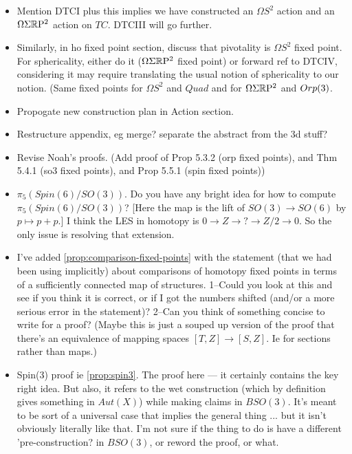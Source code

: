 \documentclass{amsart}
\begin{document}
\begin{itemize}
\item Mention DTCI plus this implies we have constructed an $\Omega S^2$ action and an $\Omega \Sigma \mathbb R \mathrm{P}^2$ action on $TC$.  DTCIII will go further.
\item Similarly, in ho fixed point section, discuss that pivotality is $\Omega S^2$ fixed point.  For sphericality, either do it ($\Omega \Sigma \mathbb R \mathrm{P}^2$ fixed point) or forward ref to DTCIV, considering it may require translating the usual notion of sphericality to our notion.  (Same fixed points for $\Omega S^2$ and $Quad$ and for $\Omega \Sigma \mathbb R \mathrm{P}^2$ and $Orp(3)$.
\end{itemize}

\begin{itemize}
\item Propogate new construction plan in Action section.
\item Restructure appendix, eg merge? separate the abstract from the 3d stuff?
\item Revise Noah's proofs. (Add proof of Prop 5.3.2 (orp fixed points), and Thm 5.4.1 (so3 fixed points), and Prop 5.5.1 (spin fixed points))
\end{itemize}

\begin{itemize}
\item $\pi_5(Spin(6)/SO(3))$. Do you have any bright idea for how to compute $\pi_5(Spin(6)/SO(3))$? [Here the map is the lift of $SO(3) \to SO(6)$ by $p \mapsto p + p$.] I think the LES in homotopy is $0 \to Z \to ? \to Z/2 \to 0$. So the only issue is resolving that extension.
\item I've added \cref{prop:comparison-fixed-points} with the statement (that we had been using implicitly) about comparisons of homotopy fixed points in terms of a sufficiently connected map of structures. 1--Could you look at this and see if you think it is correct, or if I got the numbers shifted (and/or a more serious error in the statement)? 2--Can you think of something concise to write for a proof? (Maybe this is just a souped up version of the proof that there's an equivalence of mapping spaces $[T,Z] \to [S,Z]$. Ie for sections rather than maps.)
\item Spin(3) proof ie \cref{prop:spin3}. The proof here --- it certainly contains the key right idea. But also, it refers to the wet construction (which by definition gives something in $Aut(X)$) while making claims in $BSO(3)$. It's meant to be sort of a universal case that implies the general thing ... but it isn't obviously literally like that. I'm not sure if the thing to do is have a different 'pre-construction? in $BSO(3)$, or reword the proof, or what.
\end{itemize}
\end{document}
